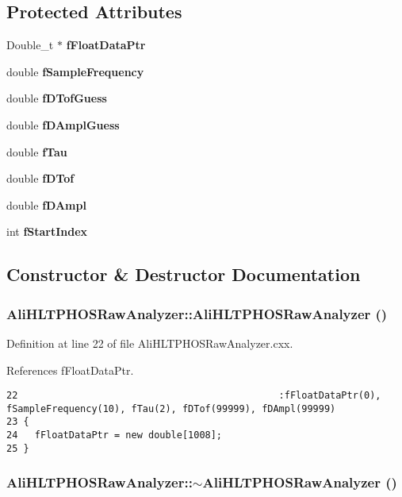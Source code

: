 \subsection*{Protected Attributes}
\begin{CompactItemize}
\item 
Double\_\-t $\ast$ {\bf f\-Float\-Data\-Ptr}
\item 
double {\bf f\-Sample\-Frequency}
\item 
double {\bf f\-DTof\-Guess}
\item 
double {\bf f\-DAmpl\-Guess}
\item 
double {\bf f\-Tau}
\item 
double {\bf f\-DTof}
\item 
double {\bf f\-DAmpl}
\item 
int {\bf f\-Start\-Index}
\end{CompactItemize}


\subsection{Constructor \& Destructor Documentation}
\subsubsection{\setlength{\rightskip}{0pt plus 5cm}Ali\-HLTPHOSRaw\-Analyzer::Ali\-HLTPHOSRaw\-Analyzer ()}\label{classAliHLTPHOSRawAnalyzer_a0}




Definition at line 22 of file Ali\-HLTPHOSRaw\-Analyzer.cxx.

References f\-Float\-Data\-Ptr.

\footnotesize\begin{verbatim}22                                              :fFloatDataPtr(0), fSampleFrequency(10), fTau(2), fDTof(99999), fDAmpl(99999)
23 {
24   fFloatDataPtr = new double[1008];
25 }
\end{verbatim}\normalsize 


\subsubsection{\setlength{\rightskip}{0pt plus 5cm}Ali\-HLTPHOSRaw\-Analyzer::$\sim${\bf Ali\-HLTPHOSRaw\-Analyzer} ()\hspace{0.3cm}{\tt  [virtual]}}\label{classAliHLTPHOSRawAnalyzer_a1}




